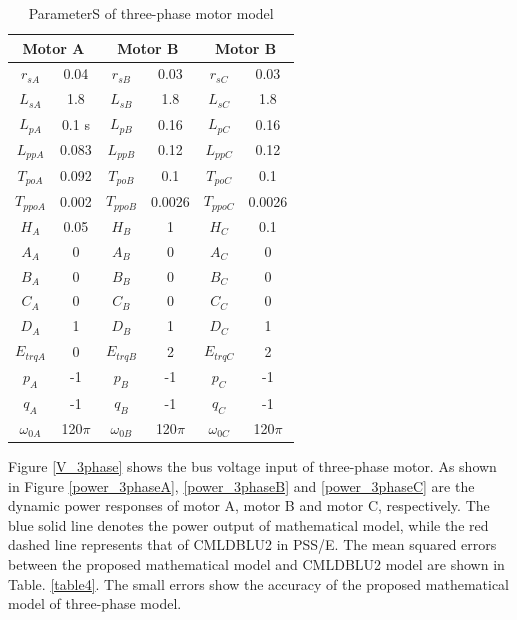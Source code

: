 \documentclass[journal]{IEEEtran}
\begin{document}
	\begin{table}
		\caption{ParameterS of three-phase motor model \cite{PSERC2017}}
		\label{table2}
		\setlength{\tabcolsep}{9.7pt}
		\begin{tabular}{|c|c|c|c|c|c|}	
			\hline
			\multicolumn{2}{|c|}{Motor A}&\multicolumn{2}{c|}{Motor B}&\multicolumn{2}{c|}{Motor B}\\
			\hline
			$r_{sA}$& 
			0.04&
			$r_{sB}$& 
			0.03&
			$r_{sC}$& 
			0.03\\
			$L_{sA}$& 
			1.8&
			$L_{sB}$& 
			1.8&
			$L_{sC}$& 
			1.8\\
			$L_{pA}$& 
			0.1 s&
			$L_{pB}$& 
			0.16&
			$L_{pC}$& 
			0.16\\
			$L_{ppA}$& 
			0.083&
			$L_{ppB}$& 
			0.12&
			$L_{ppC}$& 
			0.12 \\
			$T_{poA}$& 
			0.092&
			$T_{poB}$& 
			0.1&
			$T_{poC}$& 
			0.1\\
			$T_{ppoA}$& 
			0.002&
			$T_{ppoB}$& 
			0.0026&
			$T_{ppoC}$& 
			0.0026\\
			$H_A$& 
			0.05&
			$H_B$& 
			1&
			$H_C$& 
			0.1\\
			$A_A$& 	0&	$A_B$& 	0&
			$A_C$& 	0\\
			$B_A$& 	0&
			$B_B$& 	0&$B_C$	&0 \\
			$C_A$& 	0&	$C_B$& 	0&
			$C_C$& 	0\\
			$D_A$& 	1&	$D_B$& 	1&
			$D_C$& 	1\\
			$E_{trqA}$& 
			0 &
			$E_{trqB}$& 
			2&
			$E_{trqC}$& 
			2\\
			$p_A$& 	-1&	$p_B$& 	-1&
			$p_C$& 	-1\\
			$q_A$& 	-1&	$q_B$& 	-1&
			$q_C$& 	-1\\
			$\omega_{0A}$& 
			120$\pi$ &
			$\omega_{0B}$& 
			120$\pi$&
			$\omega_{0C}$& 
			120$\pi$\\
			\hline
		\end{tabular}
		\label{tab2}
	\end{table}
	Figure \ref{V_3phase} shows the bus voltage input of three-phase motor. As shown in Figure \ref{power_3phaseA}, \ref{power_3phaseB} and \ref{power_3phaseC} are the dynamic power responses of motor A, motor B and motor C, respectively. The blue solid line denotes the power output of mathematical model, while the red dashed line represents that of CMLDBLU2 in PSS/E. The mean squared errors between the proposed mathematical model and CMLDBLU2 model are shown in Table. \ref{table4}. The small errors show the accuracy of the proposed mathematical model of three-phase model.
\end{document}
